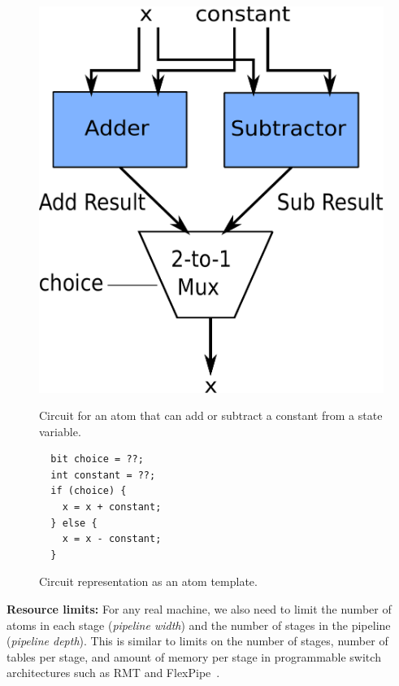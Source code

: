 \begin{figure}[h]
  \begin{minipage}{0.4\columnwidth}
  \begin{center}
  \includegraphics[width=\columnwidth]{circuit.pdf}
  \end{center}
  \caption{Circuit for an atom that can add or subtract a constant from a state variable.}
  \label{fig:alu_diag}
  \end{minipage}
  \hspace{0.05\columnwidth}
  \begin{minipage}{0.55\columnwidth}
  \begin{lstlisting}
  bit choice = ??;
  int constant = ??;
  if (choice) {
    x = x + constant;
  } else {
    x = x - constant;
  }
  \end{lstlisting}
  \caption{Circuit representation as an atom template.}
  \label{fig:alu_in_sketch}
  \end{minipage}
\end{figure}

\textbf{Resource limits:} For any real machine, we also need to limit the
number of atoms in each stage (\textit{pipeline width}) and the number of
stages in the pipeline (\textit{pipeline depth}). This is similar to limits on
the number of stages, number of tables per stage, and amount of memory per
stage in programmable switch architectures such as RMT and
FlexPipe~\cite{lavanya_compiler}.


